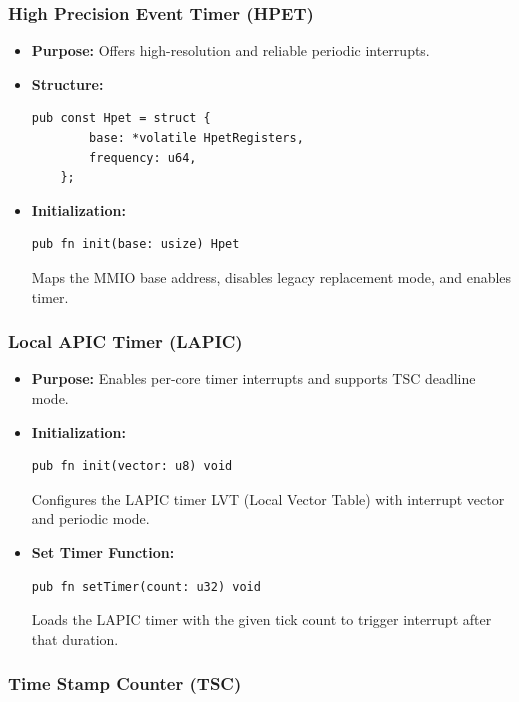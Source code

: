 \documentclass[12pt]{extarticle}
\begin{document}
\subsubsection*{High Precision Event Timer (HPET)}

\begin{itemize}
    \item \textbf{Purpose:} Offers high-resolution and reliable periodic interrupts.
    
    \item \textbf{Structure:}
    \begin{lstlisting}[language=zig]
    pub const Hpet = struct {
        base: *volatile HpetRegisters,
        frequency: u64,
    };
    \end{lstlisting}

    \item \textbf{Initialization:}
    \begin{lstlisting}[language=zig]
    pub fn init(base: usize) Hpet
    \end{lstlisting}
    Maps the MMIO base address, disables legacy replacement mode, and enables timer.
\end{itemize}

\subsubsection*{Local APIC Timer (LAPIC)}

\begin{itemize}
    \item \textbf{Purpose:} Enables per-core timer interrupts and supports TSC deadline mode.

    \item \textbf{Initialization:}
    \begin{lstlisting}[language=zig]
    pub fn init(vector: u8) void
    \end{lstlisting}
    Configures the LAPIC timer LVT (Local Vector Table) with interrupt vector and periodic mode.

    \item \textbf{Set Timer Function:}
    \begin{lstlisting}[language=zig]
    pub fn setTimer(count: u32) void
    \end{lstlisting}
    Loads the LAPIC timer with the given tick count to trigger interrupt after that duration.
\end{itemize}

\subsubsection*{Time Stamp Counter (TSC)}
\end{document}
